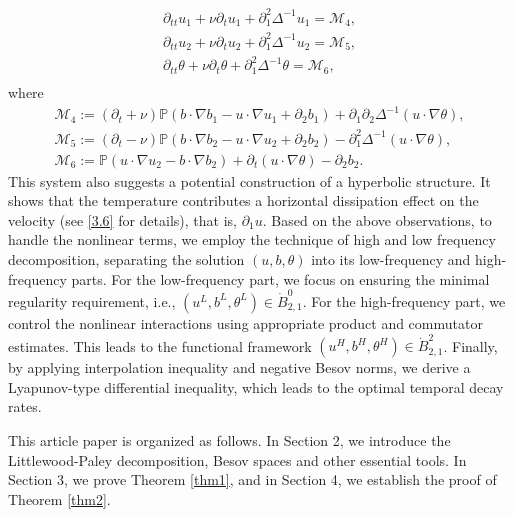 \documentclass[reqno]{amsart}
\begin{document}
\begin{equation} \label{1.1.4}
\begin{gathered}
 \partial_{tt}u_1+\nu\partial_tu_1+\partial_1^2\Delta^{-1}u_1=\mathcal{M}_4,\\
 \partial_{tt}u_2+\nu\partial_t u_2+\partial_1^2\Delta^{-1}u_2=\mathcal{M}_5,\\
 \partial_{tt}\theta+\nu\partial_t\theta+\partial_1^2\Delta^{-1}\theta=\mathcal{M}_6,\\
 \end{gathered}
\end{equation}
 where
\begin{gather*}
\mathcal{M}_4:=(\partial_t+\nu)\mathbb{P}(b\cdot\nabla b_1-u\cdot\nabla u_1+\partial_2b_1)+\partial_1\partial_2\Delta^{-1}(u\cdot\nabla\theta),\\
\mathcal{M}_5:=(\partial_t-\nu)\mathbb{P}(b\cdot\nabla b_2-u\cdot\nabla u_2+\partial_2b_2)-\partial_1^2\Delta^{-1}(u\cdot\nabla\theta),\\
\mathcal{M}_6:=\mathbb{P}(u\cdot\nabla u_2-b\cdot\nabla b_2)+\partial_t(u\cdot\nabla \theta)-\partial_2b_2.
\end{gather*}
This system also suggests a potential construction of a hyperbolic structure. It shows that the
temperature contributes a horizontal dissipation effect on the velocity (see \eqref{3.6} for details),
that is, $\partial_1u$. Based on the above observations, to handle the nonlinear terms, we employ
the technique of high and low frequency decomposition, separating the solution $(u,b,\theta)$ into
its low-frequency and high-frequency parts. For the low-frequency part, we focus on ensuring the
minimal regularity requirement, i.e., $(u^L,b^L,\theta^L)\in\dot{B}^0_{2,1}$. For the high-frequency part,
we control the nonlinear interactions using appropriate product and commutator estimates.
This leads to the functional framework $(u^H,b^H,\theta^H)\in\dot{B}^2_{2,1}$. Finally, by applying interpolation inequality and negative Besov norms, we derive a Lyapunov-type differential inequality,
which leads to the optimal temporal decay rates.

This article paper is organized as follows. In Section 2, we introduce the Littlewood-Paley
decomposition, Besov spaces and other essential tools. In Section 3, we prove
Theorem \ref{thm1}, and in Section 4, we establish the proof of Theorem \ref{thm2}.
\end{document}
